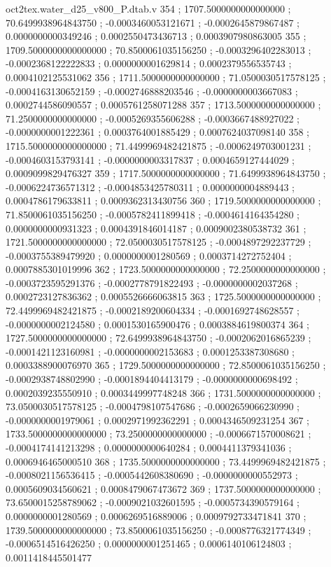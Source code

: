\begin{filecontents}[overwrite]{oct2tex.water_d25_v800_P.dtab.v}
354 ; 1707.5000000000000000 ; 70.6499938964843750 ; -0.0003460053121671 ; -0.0002645879867487 ; 0.0000000000349246 ; 0.0002550473436713 ; 0.0003907980863005
355 ; 1709.5000000000000000 ; 70.8500061035156250 ; -0.0003296402283013 ; -0.0002368122222833 ; 0.0000000001629814 ; 0.0002379556535743 ; 0.0004102125531062
356 ; 1711.5000000000000000 ; 71.0500030517578125 ; -0.0004163130652159 ; -0.0002746888203546 ; -0.0000000003667083 ; 0.0002744586090557 ; 0.0005761258071288
357 ; 1713.5000000000000000 ; 71.2500000000000000 ; -0.0005269355606288 ; -0.0003667488927022 ; -0.0000000001222361 ; 0.0003764001885429 ; 0.0007624037098140
358 ; 1715.5000000000000000 ; 71.4499969482421875 ; -0.0006249703001231 ; -0.0004603153793141 ; -0.0000000003317837 ; 0.0004659127444029 ; 0.0009099829476327
359 ; 1717.5000000000000000 ; 71.6499938964843750 ; -0.0006224736571312 ; -0.0004853425780311 ; 0.0000000004889443 ; 0.0004786179633811 ; 0.0009362313430756
360 ; 1719.5000000000000000 ; 71.8500061035156250 ; -0.0005782411899418 ; -0.0004614164354280 ; 0.0000000000931323 ; 0.0004391846014187 ; 0.0009002380538732
361 ; 1721.5000000000000000 ; 72.0500030517578125 ; -0.0004897292237729 ; -0.0003755389479920 ; 0.0000000001280569 ; 0.0003714272752404 ; 0.0007885301019996
362 ; 1723.5000000000000000 ; 72.2500000000000000 ; -0.0003723595291376 ; -0.0002778791822493 ; -0.0000000002037268 ; 0.0002723127836362 ; 0.0005526666063815
363 ; 1725.5000000000000000 ; 72.4499969482421875 ; -0.0002189200604334 ; -0.0001692748628557 ; -0.0000000002124580 ; 0.0001530165900476 ; 0.0003884619800374
364 ; 1727.5000000000000000 ; 72.6499938964843750 ; -0.0002062016865239 ; -0.0001421123160981 ; -0.0000000002153683 ; 0.0001253387308680 ; 0.0003388900076970
365 ; 1729.5000000000000000 ; 72.8500061035156250 ; -0.0002938748802990 ; -0.0001894404413179 ; -0.0000000000698492 ; 0.0002039235550910 ; 0.0003449997748248
366 ; 1731.5000000000000000 ; 73.0500030517578125 ; -0.0004798107547686 ; -0.0002659066230990 ; -0.0000000001979061 ; 0.0002971992362291 ; 0.0004346509231254
367 ; 1733.5000000000000000 ; 73.2500000000000000 ; -0.0006671570008621 ; -0.0004174141213298 ; 0.0000000000640284 ; 0.0004411379341036 ; 0.0006946465000510
368 ; 1735.5000000000000000 ; 73.4499969482421875 ; -0.0008021156536415 ; -0.0005442608380690 ; -0.0000000000552973 ; 0.0005609034560621 ; 0.0008479067473672
369 ; 1737.5000000000000000 ; 73.6500015258789062 ; -0.0009021032601595 ; -0.0005734390579164 ; 0.0000000001280569 ; 0.0006269516889006 ; 0.0009792733471841
370 ; 1739.5000000000000000 ; 73.8500061035156250 ; -0.0008776321774349 ; -0.0006514516426250 ; 0.0000000001251465 ; 0.0006140106124803 ; 0.0011418445501477

\end{filecontents}
